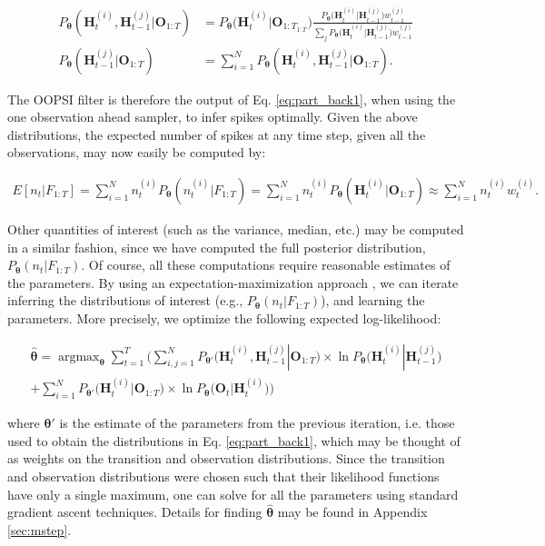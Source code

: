 \documentclass[12pt]{article}
\providecommand{\ve}[1]{\boldsymbol{#1}}
\providecommand{\ve}[1]{\boldsymbol{#1}}
\DeclareMathOperator*{\argmax}{argmax}
\newcommand{\thetn}{\ve{\theta}}
\newcommand{\theto}{\ve{\theta}'}
\newcommand{\p}{P_{\thetn}}
\begin{document}
\begin{subequations} \label{eq:part_back1}
\begin{align} \label{eq:part_joint1}
\p(\ve{H}_t^{(i)}, \ve{H}_{t-1}^{(j)} | \ve{O}_{1:T}) %
&=\p \big(\ve{H}^{(i)}_t | \ve{O}_{1:T_{1:T}}\big) \frac{
\p \big(\ve{H}^{(i)}_t | \ve{H}^{(j)}_{t-1} \big)
w_{t-1}^{(j)}}{\sum_j \p \big(\ve{H}^{(i)}_t | \ve{H}^{(j)}_{t-1} \big) w_{t-1}^{(j)}}
\\ \label{eq:part_marg1}  \p(\ve{H}_{t-1}^{(j)} | \ve{O}_{1:T})
&= \sum_{i=1}^N \p(\ve{H}_t^{(i)}, \ve{H}_{t-1}^{(j)} | \ve{O}_{1:T}).
\end{align}
\end{subequations}

\noindent The OOPSI filter is therefore the output of Eq. \ref{eq:part_back1}, when using the one observation ahead sampler, to infer spikes optimally.  Given the above distributions, the expected number of spikes at any time step, given all the observations, may now easily be computed by:

\begin{align}
E[n_t | F_{1:T}]=  \sum_{i=1}^N n_t^{(i)} \p(n_t^{(i)} | F_{1:T})=
 \sum_{i=1}^N n_t^{(i)} \p(\ve{H}_t^{(i)} | \ve{O}_{1:T}) \approx \sum_{i=1}^N n_t^{(i)} w_t^{(i)}.
\end{align}

\noindent Other quantities of interest (such as the variance, median, etc.) may be computed in a similar fashion, since we have computed the full posterior distribution, $\p(n_t | F_{1:T})$.  Of course, all these computations require reasonable estimates of the parameters. By using an expectation-maximization approach \cite{DempsterRubin77}, we can iterate inferring the distributions of interest (e.g., $\p(n_t | F_{1:T})$), and learning the parameters.  More precisely, we optimize the following expected log-likelihood:

\begin{multline} \label{eq:m_tot}
\widehat{\ve{\theta}} = \argmax_{\ve{\theta}} \sum_{t=1}^T \Bigg( \sum_{i,j=1}^N P_{\theto} \big(\ve{H}_t^{(i)}, \ve{H}_{t-1}^{(j)} | \ve{O}_{1:T}\big)\times \ln \p\big(\ve{H}_t^{(i)} | \ve{H}_{t-1}^{(j)}\big) \\ 
+ \sum_{i=1}^N  P_{\theto} \big(\ve{H}_t^{(i)} | \ve{O}_{1:T}\big) \times \ln \p\big(\ve{O}_t | \ve{H}_t^{(i)}\big)\Bigg) 
\end{multline}

\noindent where $\ve{\theta}'$ is the estimate of the parameters from the previous iteration, i.e. those used to obtain the distributions in Eq. \ref{eq:part_back1},  which may be thought of as weights on the transition and observation distributions.  Since the transition and observation distributions were chosen such that their likelihood functions have only a single maximum,  one can solve for all the parameters using standard gradient ascent techniques.  Details for finding $\widehat{\ve{\theta}}$ may be found in Appendix \ref{sec:mstep}.
\end{document}
